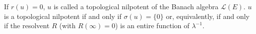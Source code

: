 If $r(u) = 0$, $u$ is called a topological nilpotent of the Banach algebra $\mathcal{L}(E)$. $u$ is a topological nilpotent if and only if $\sigma(u) = \{0\}$ or, equivalently, if and only if the resolvent $R$ (with $R(\infty) = 0$) is an entire function of $\lambda^{-1}$.
